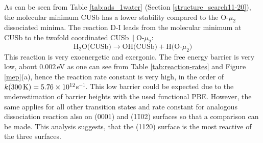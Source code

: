 \documentclass[11pt,DIV=13,BCOR=5mm,a4paper,headinclude]{scrbook}
\newcommand\todo[1]{\textcolor{red}{TODO: \textit{{#1}}}}
\begin{document}
As can be seen from Table \ref{tab:ads_1water} (Section \ref{structure_search11-20}), the molecular minimum CUSb has a lower stability compared to the O-$\mu_2$ dissociated minima.
The reaction D-I leads from the molecular minimum at CUSb to the twofold coordinated CUSb$\parallel$O-$\mu_2$:
 \begin{equation}
 \text{H$_2$O(CUSb)} \rightarrow \text{OH(CUSb)} + \text{H(O-$\mu_2$)} \tag{D-I}
      \label{dissI}
\end{equation}
This reaction is very exoenergetic and exergonic.
The free energy barrier is very low, about $0.002\,$eV as one can see from Table \ref{tab:reaction-rates} and Figure \ref{mep}(a), hence the reaction rate constant is very high, in the order of $k(\textrm{300\,K})=5.76\times 10^{12}$s$^{-1}$.
This low barrier could be expected due to the underestimation of barrier heights\cite{Zhao05} with the used functional PBE. %
However, the same applies for all other transition states and rate constant for analogous dissociation reaction also on (0001) and (1\=102) surfaces so that a comparison can be made.
This analysis suggests, that the (11\=20) surface is the most reactive of the three surfaces\cite{WirthJPCC2012,Wirth2016}. %
\end{document}
